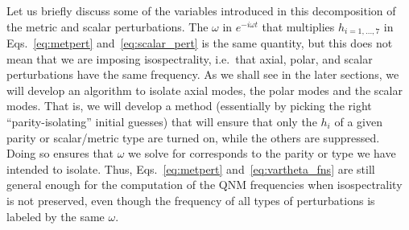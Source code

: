 \documentclass[aps,prx,amsmath,floats,floatfix,twocolumn,
  superscriptaddress,nofootinbib,showpacs]{revtex4-1}
\begin{document}
Let us briefly discuss some of the variables introduced in this decomposition of the metric and scalar perturbations. 
The $\omega$ in $e^{-i \omega t}$ that multiplies $h_{i=1,...,7}$ in Eqs.~\eqref{eq:metpert} and~\eqref{eq:scalar_pert} is the same quantity, but this does not mean that we are imposing isospectrality, i.e.~that axial, polar, and scalar perturbations have the same frequency. 
As we shall see in the later sections, we will develop an algorithm to isolate axial modes, the polar modes and the scalar modes. That is, we will develop a method (essentially by picking the right ``parity-isolating'' initial guesses) that will ensure that only the $h_i$ of a given parity or scalar/metric type are turned on, while the others are suppressed. Doing so ensures that $\omega$ we solve for corresponds to the parity or type we have intended to isolate.  
Thus, Eqs.~\eqref{eq:metpert} and~\eqref{eq:vartheta_fns} are still general enough for the computation of the QNM frequencies when isospectrality is not preserved, even though the frequency of all types of perturbations is labeled by the same $\omega$. 
\end{document}
